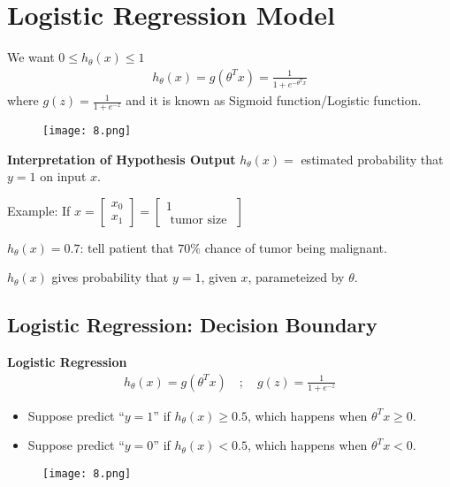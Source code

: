 \documentclass[12pt,a4paper,fleqn]{article}
\begin{document}
\section{Logistic Regression Model}

We want \(0 \leq h_\theta(x) \leq 1\)
\begin{align*}
h_\theta(x)=g\left(\theta^T x\right)=\frac{1}{1+e^{-\theta^T x}}
\end{align*}
where \(g(z)=\frac{1}{1+e^{-z}}\) and it is known as Sigmoid function/Logistic function.

\begin{figure}[H]
    \centering
    \texttt{[image: 8.png]}
\end{figure}

\textbf{Interpretation of Hypothesis Output} \(h_\theta(x)=\) estimated probability that \(y=1\) on input \(x\).

Example: If \(x=\left[\begin{array}{l}x_0 \\ x_1\end{array}\right]=\left[\begin{array}{c}1 \\ \text { tumor size }\end{array}\right]\)

\(h_\theta(x)=0.7\): tell patient that \(70 \% \) chance of tumor being malignant.

\(h_\theta(x)\) gives probability that \(y=1\), given \(x\), parameteized by \(\theta \).

 \subsection{Logistic Regression: Decision Boundary} 
 \textbf{Logistic Regression}
 \begin{align*}
 h_\theta(x)=g\left(\theta^T x\right) \quad ; \quad g(z)=\frac{1}{1+e^{-z}}
 \end{align*}
\begin{itemize}
    \item Suppose predict  ``\(y=1\)'' if \(h_\theta(x) \geq 0.5\), which happens when \(\theta^T x \geq 0\).
    \item Suppose predict ``\(y=0\)'' if \(h_\theta(x)<0.5\), which happens when \(\theta^T x<0\).
\end{itemize}
\begin{figure}[H]
    \centering
    \texttt{[image: 8.png]}
\end{figure}
\end{document}
